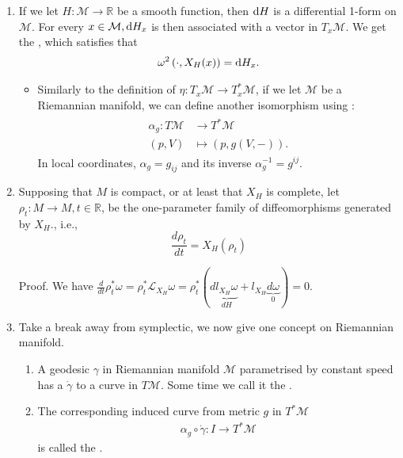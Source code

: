 \documentclass{article}
\begin{document}
\begin{enumerate}
\item {} If we let $H: \mathcal{M} \to \mathbb{R}$ be a smooth function, then $\mathrm{d} H$ is a differential 1-form on $\mathcal{M}$. For every $x \in \mathcal{M}, \mathrm{d} H_x$ is then associated with a vector in $T_x \mathcal{M}$. We get the , which satisfies that
\begin{align*}
\omega^2\left(\cdot, X_H(x)\right)=\mathrm{d} H_x .
\end{align*}
\begin{itemize}
    \item {} Similarly to the definition of $\eta: T_x \mathcal{M} \longrightarrow T_x^* \mathcal{M}$, if we let $\mathcal{M}$ be a Riemannian manifold, we can define another isomorphism using :
\begin{align*}
\begin{aligned}
\alpha_g: T \mathcal{M} & \longrightarrow T^* \mathcal{M} \\
(p, V) & \longmapsto(p, g(V,-)) .
\end{aligned}
\end{align*}
In local coordinates, $\alpha_g=g_{i j}$ and its inverse $\alpha_g^{-1}=g^{i j}$.
\end{itemize}

\item Supposing that $M$ is compact, or at least that $X_H$ is complete, let $\rho_t: M \rightarrow M, t \in \mathbb{R}$, be the one-parameter family of diffeomorphisms generated by $X_H$., i.e.,
$$\frac{d \rho_t}{d t}=X_H (\rho_t) $$
 

{\tiny Proof. We have $\frac{d}{d t} \rho_t^* \omega=\rho_t^* \mathcal{L}_{X_H} \omega=\rho_t^*(d \underbrace{l_{X_H} \omega}_{d H}+l_{X_H} \underbrace{d \omega}_0)=0$.}




\item {} Take a break away from symplectic, we now give one concept on  Riemannian manifold.
\begin{enumerate}
    \item {} A geodesic $\gamma$ in Riemannian manifold $\mathcal{M}$ parametrised by constant speed has a   $\dot{\gamma}$ to a curve in $T \mathcal{M}$. Some time we call it the  .
    \item The corresponding induced curve from metric $g$ in $T^* \mathcal{M}$ 
\begin{align*}
\alpha_{g} \circ \dot{\gamma}: I \longrightarrow T^* \mathcal{M}
\end{align*}
is called the .
\end{enumerate}


\end{enumerate}
\end{document}
